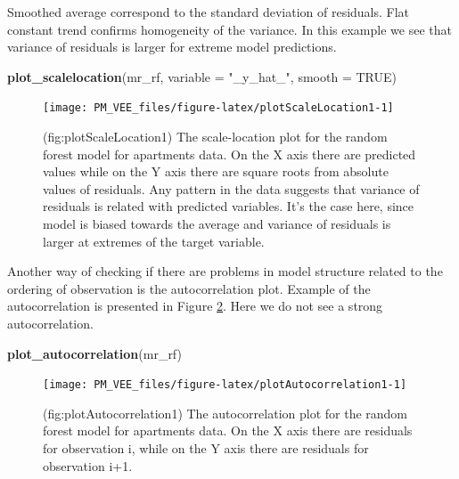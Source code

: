 \documentclass[12pt,]{krantz}
\newenvironment{Shaded}{\begin{snugshade}}{\end{snugshade}}
\newcommand{\DataTypeTok}[1]{\textcolor[rgb]{0.13,0.29,0.53}{#1}}
\newcommand{\KeywordTok}[1]{\textcolor[rgb]{0.13,0.29,0.53}{\textbf{#1}}}
\newcommand{\NormalTok}[1]{#1}
\newcommand{\OtherTok}[1]{\textcolor[rgb]{0.56,0.35,0.01}{#1}}
\newcommand{\StringTok}[1]{\textcolor[rgb]{0.31,0.60,0.02}{#1}}
\begin{document}
Smoothed average correspond to the standard deviation of residuals. Flat constant trend confirms homogeneity of the variance. In this example we see that variance of residuals is larger for extreme model predictions.

\begin{Shaded}
\begin{Highlighting}[]
\KeywordTok{plot_scalelocation}\NormalTok{(mr_rf, }\DataTypeTok{variable =} \StringTok{"_y_hat_"}\NormalTok{, }\DataTypeTok{smooth =} \OtherTok{TRUE}\NormalTok{)}
\end{Highlighting}
\end{Shaded}

\begin{figure}

{\centering \texttt{[image: PM\_VEE\_files/figure-latex/plotScaleLocation1-1]} 

}

\caption{(fig:plotScaleLocation1) The scale-location plot for the random forest model for apartments data. On the X axis there are predicted values while on the Y axis there are square roots from absolute values of residuals. Any pattern in the data suggests that variance of residuals is related with predicted variables. It's the case here, since model is biased towards the average and variance of residuals is larger at extremes of the target variable.}\label{fig:plotScaleLocation1}
\end{figure}

Another way of checking if there are problems in model structure related to the ordering of observation is the autocorrelation plot. Example of the autocorrelation is presented in Figure \ref{fig:plotAutocorrelation1}. Here we do not see a strong autocorrelation.

\begin{Shaded}
\begin{Highlighting}[]
\KeywordTok{plot_autocorrelation}\NormalTok{(mr_rf)}
\end{Highlighting}
\end{Shaded}

\begin{figure}

{\centering \texttt{[image: PM\_VEE\_files/figure-latex/plotAutocorrelation1-1]} 

}

\caption{(fig:plotAutocorrelation1) The autocorrelation plot for the random forest model for apartments data. On the X axis there are residuals for observation i, while on the Y axis there are residuals for observation i+1. }\label{fig:plotAutocorrelation1}
\end{figure}
\end{document}
